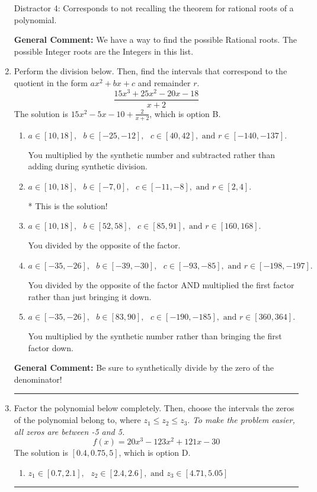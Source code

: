 \documentclass{extbook}[14pt]
\newcommand{\litem}[1]{\item #1

\rule{\textwidth}{0.4pt}}
\begin{document}
\begin{enumerate}
{\begin{enumerate}[label=\Alph*.]
 Distractor 4: Corresponds to not recalling the theorem for rational roots of a polynomial.
\end{enumerate}

\textbf{General Comment:} We have a way to find the possible Rational roots. The possible Integer roots are the Integers in this list.
}
\litem{
Perform the division below. Then, find the intervals that correspond to the quotient in the form $ax^2+bx+c$ and remainder $r$.
\[ \frac{15x^{3} +25 x^{2} -20 x -18}{x + 2} \]The solution is \( 15x^{2} -5 x -10 + \frac{2}{x + 2} \), which is option B.\begin{enumerate}[label=\Alph*.]
\item \( a \in [10, 18], \text{   } b \in [-25, -12], \text{   } c \in [40, 42], \text{   and   } r \in [-140, -137]. \)

 You multiplied by the synthetic number and subtracted rather than adding during synthetic division.
\item \( a \in [10, 18], \text{   } b \in [-7, 0], \text{   } c \in [-11, -8], \text{   and   } r \in [2, 4]. \)

* This is the solution!
\item \( a \in [10, 18], \text{   } b \in [52, 58], \text{   } c \in [85, 91], \text{   and   } r \in [160, 168]. \)

 You divided by the opposite of the factor.
\item \( a \in [-35, -26], \text{   } b \in [-39, -30], \text{   } c \in [-93, -85], \text{   and   } r \in [-198, -197]. \)

 You divided by the opposite of the factor AND multiplied the first factor rather than just bringing it down.
\item \( a \in [-35, -26], \text{   } b \in [83, 90], \text{   } c \in [-190, -185], \text{   and   } r \in [360, 364]. \)

 You multiplied by the synthetic number rather than bringing the first factor down.
\end{enumerate}

\textbf{General Comment:} Be sure to synthetically divide by the zero of the denominator!
}
\litem{
Factor the polynomial below completely. Then, choose the intervals the zeros of the polynomial belong to, where $z_1 \leq z_2 \leq z_3$. \textit{To make the problem easier, all zeros are between -5 and 5.}
\[ f(x) = 20x^{3} -123 x^{2} +121 x -30 \]The solution is \( [0.4, 0.75, 5] \), which is option D.\begin{enumerate}[label=\Alph*.]
\item \( z_1 \in [0.7, 2.1], \text{   }  z_2 \in [2.4, 2.6], \text{   and   } z_3 \in [4.71, 5.05] \)


\end{enumerate}}
\end{enumerate}
\end{document}

